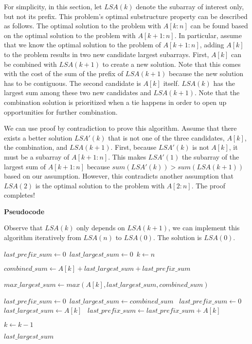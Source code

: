 \documentclass[12pt,article]{article}
\begin{document}
For simplicity, in this section, let $LSA(k)$ denote the subarray of interest only, but not its prefix. This problem's optimal substructure property can be described as follows. The optimal solution to the problem with $A[k:n]$ can be found based on the optimal solution to the problem with $A[k+1:n]$. In particular, assume that we know the optimal solution to the problem of $A[k+1:n]$, adding $A[k]$ to the problem results in two new candidate largest subarrays. First, $A[k]$ can be combined with $LSA(k+1)$ to create a new solution. Note that this comes with the cost of the sum of the prefix of $LSA(k+1)$ because the new solution has to be contiguous. The second candidate is $A[k]$ itself. $LSA(k)$ has the largest sum among these two new candidates and $LSA(k+1)$. Note that the combination solution is prioritized when a tie happens in order to open up opportunities for further combination.

We can use proof by contradiction to prove this algorithm. Assume that there exists a better solution $LSA'(k)$ that is not one of the three candidates, $A[k]$, the combination, and $LSA(k+1)$. First, because $LSA'(k)$ is not $A[k]$, it must be a subarray of $A[k+1:n]$. This makes $LSA'(1)$ the subarray of the largest sum of $A[k+1:n]$ because $sum(LSA'(k)) > sum(LSA(k+1))$ based on our assumption. However, this contradicts another assumption that $LSA(2)$ is the optimal solution to the problem with $A[2:n]$. The proof completes!

\newpage
\textbf{Pseudocode}

Observe that $LSA(k)$ only depends on $LSA(k+1)$, we can implement this algorithm iteratively from $LSA(n)$ to $LSA(0)$. The solution is $LSA(0)$.


\begin{algorithm}
\caption{$LSA(A[1:n])$}\label{alg:LSA}
\begin{algorithmic}
    \State $last\_prefix\_sum \gets 0$\
    \State $last\_largest\_sum \gets 0$\
    \State $k \gets n$\;
    
        \State $combined\_sum \gets A[k] + last\_largest\_sum + last\_prefix\_sum$

        \State $max\_largest\_sum \gets max(A[k], last\_largest\_sum, combined\_sum)$\

        \If{$combined\_sum == max\_largest\_sum$}
            \State $last\_prefix\_sum \gets 0$\
            \State $last\_largest\_sum \gets combined\_sum$\
            \State $last\_prefix\_sum \gets 0$\
            \State $last\_largest\_sum \gets A[k]$\
            \State $last\_prefix\_sum \gets last\_prefix\_sum + A[k]$\
        \EndIf

        \State $k \gets k - 1$
    \EndWhile

    \Return $last\_largest\_sum$
\end{algorithmic}
\end{algorithm}
\end{document}
